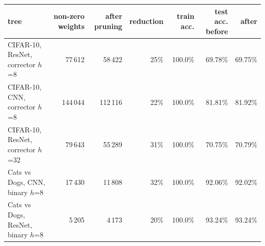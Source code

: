\begin{tabular}{@{}lrrrrrr@{}}\toprule
tree & non-zero weights & after pruning & reduction & train acc. & test acc. before & after\\\midrule
CIFAR-10, ResNet, corrector $h$=8 & 77\,612 & 58\,422 & 25\% & 100.0\% & 69.78\% & 69.75\%\\
CIFAR-10, CNN, corrector $h$=8 & 144\,044 & 112\,116 & 22\% & 100.0\% & 81.81\% & 81.92\%\\
CIFAR-10, ResNet, corrector $h$=32 & 79\,643 & 55\,289 & 31\% & 100.0\% & 70.75\% & 70.79\%\\
Cats vs Dogs, CNN, binary $h$=8 & 17\,430 & 11\,808 & 32\% & 100.0\% & 92.06\% & 92.02\%\\
Cats vs Dogs, ResNet, binary $h$=8 & 5\,205 & 4\,173 & 20\% & 100.0\% & 93.24\% & 93.24\%\\
\bottomrule\end{tabular}
